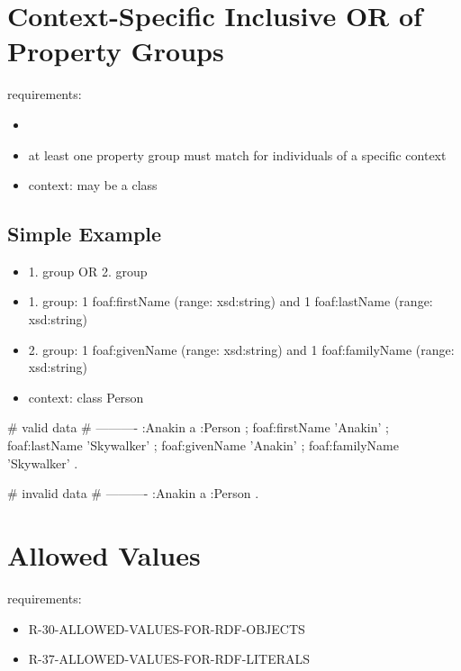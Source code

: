 \documentclass{llncs}
\begin{document}
\section{Context-Specific Inclusive OR of Property Groups}

requirements:

\begin{itemize}
	\item 
\end{itemize}



\begin{itemize}
  \item at least one property group must match for individuals of a specific context 
	\item context: may be a class
\end{itemize}

\subsection{Simple Example}

\begin{itemize}
  \item 1. group OR 2. group
	\item 1. group: 1 foaf:firstName (range: xsd:string) and 1 foaf:lastName (range: xsd:string)
	\item 2. group: 1 foaf:givenName (range: xsd:string) and 1 foaf:familyName (range: xsd:string)
	\item context: class Person
\end{itemize}

\begin{ex}
# valid data
# ----------
:Anakin
    a :Person ;
    foaf:firstName 'Anakin' ;
    foaf:lastName 'Skywalker' ;
    foaf:givenName 'Anakin' ;
    foaf:familyName 'Skywalker' .
\end{ex}

\begin{ex}
# invalid data
# ----------
:Anakin
    a :Person .
\end{ex}

\section{Allowed Values}

requirements:

\begin{itemize}
	\item R-30-ALLOWED-VALUES-FOR-RDF-OBJECTS
  \item R-37-ALLOWED-VALUES-FOR-RDF-LITERALS
\end{itemize}
\end{document}
